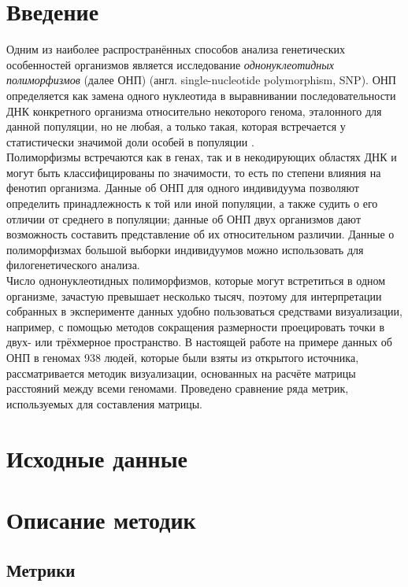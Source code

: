 \documentclass[main.tex]{subfiles}
\begin{document}
\section{Введение} \label{intro}

Одним из наиболее распространённых способов анализа генетических особенностей организмов является исследование \textit{однонуклеотидных полиморфизмов} (далее ОНП) (англ. single-nucleotide polymorphism, SNP). ОНП определяется как замена одного нуклеотида в выравнивании последовательности ДНК конкретного организма относительно некоторого генома, эталонного для данной популяции, но не любая, а только такая, которая встречается у статистически значимой доли особей в популяции \cite{butler}.\\
Полиморфизмы встречаются как в генах, так и в некодирующих областях ДНК и могут быть классифицированы по значимости, то есть по степени влияния на фенотип организма. Данные об ОНП для одного индивидуума позволяют определить принадлежность к той или иной популяции, а также судить о его отличии от среднего в популяции; данные об ОНП двух организмов дают возможность составить представление об их относительном различии. Данные о полиморфизмах большой выборки индивидуумов можно использовать для филогенетического анализа. \\
Число однонуклеотидных полиморфизмов, которые могут встретиться в одном организме, зачастую превышает несколько тысяч, поэтому для интерпретации собранных в эксперименте данных удобно пользоваться средствами визуализации, например, с помощью методов сокращения размерности проецировать точки в двух- или трёхмерное пространство. В настоящей работе на примере данных об ОНП в геномах 938 людей, которые были взяты из открытого источника, рассматривается методик визуализации, основанных на расчёте матрицы расстояний между всеми геномами. Проведено сравнение ряда метрик, используемых для составления матрицы.

\newpage
\section{Исходные данные} \label{input}

\section{Описание методик} \label{alg_desc}

\subsection{Метрики}
\end{document}
